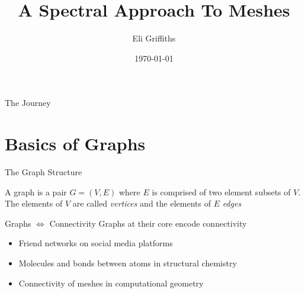 \documentclass{beamer}
\author{Eli Griffiths}
\title{A Spectral Approach To Meshes}
\institute[UCI]{University of California, Irvine}
\date{\today}
\begin{document}
\maketitle

\begin{frame}{The Journey}
    \tableofcontents
\end{frame}

\section{Basics of Graphs}

\begin{frame}{The Graph Structure}
    \begin{definition}[Graph]
        A graph is a pair $G = (V, E)$ where $E$ is comprised of two element subsets of $V$. The elements of $V$ are called \emph{vertices} and the elements of $E$ \emph{edges}
    \end{definition}
    \pause
    \begin{center}
    \end{center}
\end{frame}

\begin{frame}{Graphs $\Leftrightarrow$ Connectivity}
    Graphs at their core encode connectivity
    \begin{itemize}
        \item<2-> Friend networks on social media platforms
        \item<3-> Molecules and bonds between atoms in structural chemistry
        \item<4-> Connectivity of meshes in computational geometry
    \end{itemize}
\end{frame}

\begin{frame}
    \begin{center}
        
    \end{center}
\end{frame}
\end{document}
